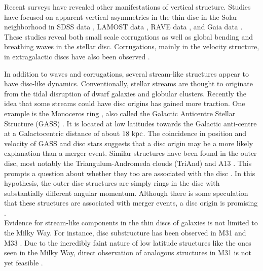 Recent surveys have revealed other manifestations of vertical structure. Studies have focused on apparent vertical asymmetries in the thin disc in the Solar neighborhood in SDSS data \citep{widrow_2012_sdss, xu_2015}, LAMOST data \citep{carlin_2013_lamost, pearl_2017}, RAVE data \citep{williams_2013_rave, carrillo_2018_rave}, and Gaia data \citep{gaia_collab,bennet_2019_gaia}. These studies reveal both small scale corrugations as well as global bending and breathing waves in the stellar disc. Corrugations, mainly in the velocity structure, in extragalactic discs have also been observed \citep[for example]{matthews_2008,sanchez_2015}. 

In addition to waves and corrugations, several stream-like structures appear to have disc-like dynamics. Conventionally, stellar streams are thought to originate from the tidal disruption of dwarf galaxies and globular clusters. Recently the idea that some streams could have disc origins has gained more traction. One example is the Monoceros ring \citep{newberg_2002, yanny_2003}, also called the Galactic Anticentre Stellar Structure (GASS) \citep{crane_2003, rocha-pinto_2003}. It is located at low latitudes towards the Galactic anti-centre at a Galactocentric distance of about $18\,\,\text{kpc}$.  The coincidence in position and velocity of GASS and disc stars suggests that a disc origin may be a more likely explanation than a merger event. Similar structures have been found in the outer disc, most notably the Triangulum-Andromeda clouds (TriAnd) \citep{triand_discovery} and A13 \citep{a13_discovery}. This prompts a question about whether they too are associated with the disc \citep{johnston_kud_review}. In this hypothesis, the outer disc structures are simply rings in the disc with substantially different angular momentum. Although there is some speculation that these structures are associated with merger events, a disc origin is promising \citep{deason_2018,monoceros_disk_origin}.\\



Evidence for stream-like components in the thin discs of galaxies is not limited to the Milky Way. For instance, disc substructure has been observed in M31 \citep{richardson_2008_m31, dorman_2013_m31, bernard_2015_m31} and M33 \citep{mcconnachie_2006_m33, mcconnachie_2010_m33}. Due to the incredibly faint nature of low latitude structures like the ones seen in the Milky Way, direct observation of analogous structures in M31 is not yet feasible \citep{johnston_kud_review}. 



